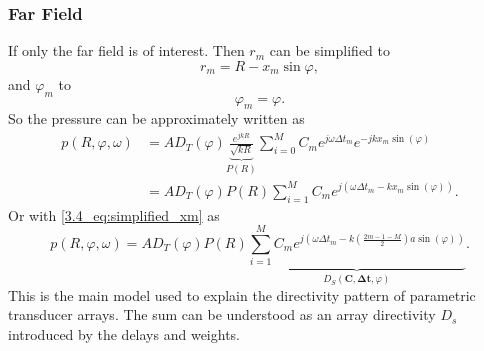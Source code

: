 \subsubsection{Far Field}
If only the far field is of interest. Then $r_{m}$ can be simplified to \cite{alma99116706330905515}
\begin{equation}
    r_{m} = R - x_m \sin{\varphi},
\end{equation}
and $\varphi_m$ to
\begin{equation}
    \varphi_m = \varphi.
\end{equation}
So the pressure can be approximately written as
\begin{align}
    p(R,\varphi,\omega) 
    &= 
     A D_T(\varphi) \underbrace{\frac{e^{j k R}}{\sqrt{k R}}}_{P(R)} \sum_{i=0}^M C_m e^{j\omega \Delta t_m}e^{-jkx_m\sin{(\varphi)}} \\
    &= 
    A D_T(\varphi) P(R) \sum_{i=1}^M C_m e^{j(\omega \Delta t_m - kx_m\sin{(\varphi)})}.
\end{align}
Or with \ref{3.4_eq:simplified_xm} as
\begin{equation}
    p(R,\varphi,\omega) 
    = 
    A D_T(\varphi) P(R) \underbrace{\sum_{i=1}^M C_m e^{j (\omega \Delta t_m -k \left ( \frac{2m -1 - M}{2} \right )a \sin{(\varphi)} )}}_{D_S(\bm{C}, \bm{\Delta t} , \varphi)}.
    \label{3_eq:beam_model_final}
\end{equation}
This is the main model used to explain the directivity pattern of parametric transducer arrays. The sum can be understood as an array directivity $D_s$ introduced by the delays and weights. 

